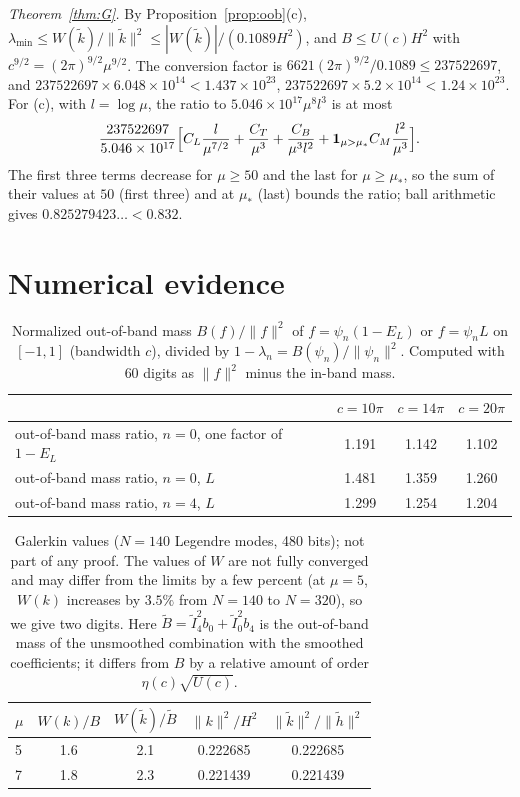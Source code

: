 \documentclass[11pt]{amsart}
\theoremstyle{remark}
\numberwithin{equation}{section}
\begin{document}
\emph{Theorem~\ref{thm:G}.} By Proposition~\ref{prop:oob}(c), $\lambda_{\min}\le W(\tilde k)/\|\tilde k\|^2\le|W(\tilde k)|/(0.1089H^2)$, and $B\le U(c)H^2$ with $c^{9/2}=(2\pi)^{9/2}\mu^{9/2}$. The conversion factor is $6621(2\pi)^{9/2}/0.1089\le237522697$, and $237522697\times6.048\times10^{14}<1.437\times10^{23}$, $237522697\times5.2\times10^{14}<1.24\times10^{23}$. For (c), with $l=\log\mu$, the ratio to $5.046\times10^{17}\mu^8l^3$ is at most
\[
\frac{237522697}{5.046\times10^{17}}\Bigl[C_L\frac{l}{\mu^{7/2}}+\frac{C_T}{\mu^3}+\frac{C_B}{\mu^3l^2}+\mathbf 1_{\mu>\mu_*}C_M\frac{l^2}{\mu^3}\Bigr].
\]
The first three terms decrease for $\mu\ge50$ and the last for $\mu\ge\mu_*$, so the sum of their values at $50$ (first three) and at $\mu_*$ (last) bounds the ratio; ball arithmetic gives $0.825279423\ldots<0.832$.

\section{Numerical evidence}\label{sec:num}

\begin{table}[h]
\centering
\begin{tabular}{lccc}
\toprule
& $c=10\pi$ & $c=14\pi$ & $c=20\pi$\\
\midrule
out-of-band mass ratio, $n=0$, one factor of $1-E_L$ & 1.191 & 1.142 & 1.102\\
out-of-band mass ratio, $n=0$, $L$ & 1.481 & 1.359 & 1.260\\
out-of-band mass ratio, $n=4$, $L$ & 1.299 & 1.254 & 1.204\\
\bottomrule
\end{tabular}
\caption{Normalized out-of-band mass $B(f)/\|f\|^2$ of $f=\psi_n(1-E_L)$ or $f=\psi_nL$ on $[-1,1]$ (bandwidth $c$), divided by $1-\lambda_n=B(\psi_n)/\|\psi_n\|^2$. Computed with 60 digits as $\|f\|^2$ minus the in-band mass.}
\end{table}

\begin{table}[h]
\centering
\begin{tabular}{lcccc}
\toprule
$\mu$ & $W(k)/B$ & $W(\tilde k)/\tilde B$ & $\|k\|^2/H^2$ & $\|\tilde k\|^2/\|\tilde h\|^2$\\
\midrule
5 & 1.6 & 2.1 & 0.222685 & 0.222685\\
7 & 1.8 & 2.3 & 0.221439 & 0.221439\\
\bottomrule
\end{tabular}
\caption{Galerkin values ($N=140$ Legendre modes, 480 bits); not part of any proof. The values of $W$ are not fully converged and may differ from the limits by a few percent (at $\mu=5$, $W(k)$ increases by $3.5\%$ from $N=140$ to $N=320$), so we give two digits. Here $\tilde B=\tilde I_4^2b_0+\tilde I_0^2b_4$ is the out-of-band mass of the unsmoothed combination with the smoothed coefficients; it differs from $B$ by a relative amount of order $\eta(c)\sqrt{U(c)}$.}
\end{table}
\end{document}
